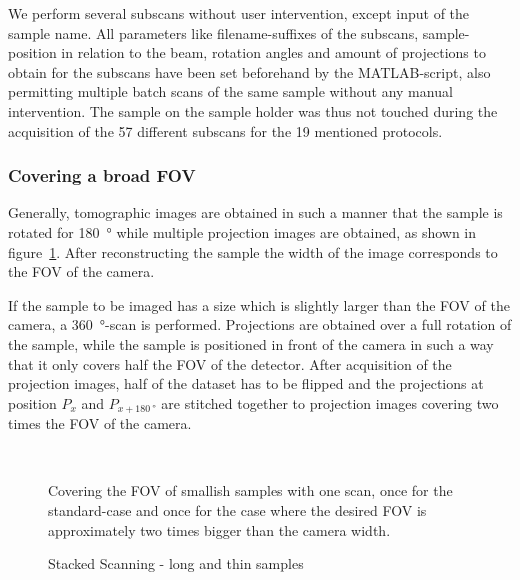 We perform several subscans without user intervention, except input of the sample name. All parameters like filename-suffixes of the subscans, sample-position in relation to the beam, rotation angles and amount of projections to obtain for the subscans have been set beforehand by the MATLAB-script, also permitting multiple batch scans of the same sample without any manual intervention. The sample on the sample holder was thus not touched during the acquisition of the 57 different subscans for the 19 mentioned protocols. 

\subsubsection{Covering a broad FOV}
\label{subsec:covering a broad fov}
Generally, tomographic images are obtained in such a manner that the sample is rotated for \SI{180}{\degree} while multiple projection images are obtained, as shown in figure~\ref{fig:covering-one scan}. After reconstructing the sample the width of the image corresponds to the FOV of the camera.

If the sample to be imaged has a size which is slightly larger than the FOV of the camera, a \SI{360}{\degree}-scan is performed. Projections are obtained over a full rotation of the sample, while the sample is positioned in front of the camera in such a way that it only covers half the FOV of the detector. After acquisition of the projection images, half of the dataset has to be flipped and the projections at position $P_{x}$ and $P_{x+\SI{180}{\degree}}$ are stitched together to projection images covering two times the FOV of the camera.

\begin{figure}
	\centering
	\\
	\caption{Covering the FOV of smallish samples with one scan, once for the standard-case and once for the case where the desired FOV is approximately two times bigger than the camera width.}
	\label{fig:covering-one scan}
\end{figure}

\begin{figure}
	\centering
	
	\caption{Stacked Scanning - long and thin samples}
	\label{fig:stacked-scanning}
\end{figure}

